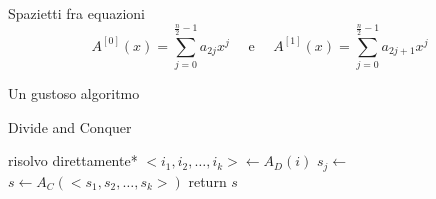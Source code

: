 
Spazietti fra equazioni
\begin{equation*}
    A^{[0]}(x) = \sum_{j=0}^{\frac{n}{2}-1} a_{2j}x^j
    \quad \text{ e } \quad
    A^{[1]}(x) = \sum_{j=0}^{\frac{n}{2}-1} a_{2j+1}x^j
\end{equation*}

Un gustoso algoritmo
\begin{algorithm}[H]
\caption{Divide and Conquer}\label{alg:dnc}
\begin{algorithmic}[1]
                                     
            \State *risolvo direttamente*
        \EndIf
        \State $<i_1, i_2, \dots, i_k> \gets A_D(i)$    
                            
            \State $s_j \gets $ 
        \EndFor
        \State $s \gets A_C(<s_1, s_2, \dots, s_k>)$    
        \State return $s$
    \EndProcedure
\end{algorithmic}
\end{algorithm}

